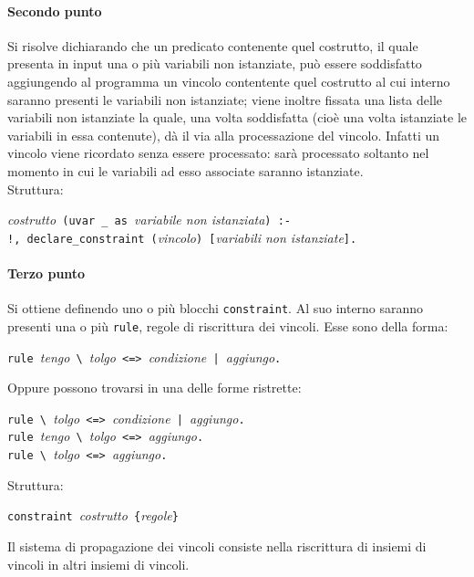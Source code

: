 \documentclass[12pt,a4paper,openright,twoside]{report}
\begin{document}
\paragraph{Secondo punto}
Si risolve dichiarando che un predicato contenente quel costrutto, il quale presenta in input una o più variabili non istanziate, può essere soddisfatto aggiungendo al programma un vincolo contentente quel costrutto al cui interno saranno presenti le variabili non istanziate; viene inoltre fissata una lista delle variabili non istanziate la quale, una volta soddisfatta (cioè una volta istanziate le variabili in essa contenute), dà il via alla processazione del vincolo. Infatti un vincolo viene ricordato senza essere processato: sarà processato soltanto nel momento in cui le variabili ad esso associate saranno istanziate.\\
Struttura:
\begin{center}
\textit{costrutto}\verb" (uvar _ as "\textit{variabile non istanziata}\verb") :-"\\
\verb"!, declare_constraint ("\textit{vincolo}\verb") ["\textit{variabili non istanziate}\verb"]."
\end{center}

\paragraph{Terzo punto}
Si ottiene definendo uno o più blocchi \verb"constraint". Al suo interno saranno presenti una o più \verb"rule", regole di riscrittura dei vincoli. Esse sono della forma:
\begin{center}
 \verb"rule "\textit{tengo}\verb" \ "\textit{tolgo}\verb" <=> "\textit{condizione}\verb" | "\textit{aggiungo}\verb"."
\end{center}
Oppure possono trovarsi in una delle forme ristrette:
\begin{center}
 \verb"rule \ "\textit{tolgo}\verb" <=> "\textit{condizione}\verb" | "\textit{aggiungo}\verb"."\\
 \verb"rule "\textit{tengo}\verb" \ "\textit{tolgo}\verb" <=> "\textit{aggiungo}\verb"."\\
 \verb"rule \ "\textit{tolgo}\verb" <=> "\textit{aggiungo}\verb"."\\
\end{center}
Struttura:
\begin{center}
 \verb"constraint "\textit{costrutto}\verb" {"\textit{regole}\verb"}"
\end{center}

Il sistema di propagazione dei vincoli consiste nella riscrittura di insiemi di vincoli in altri insiemi di vincoli.
\end{document}
